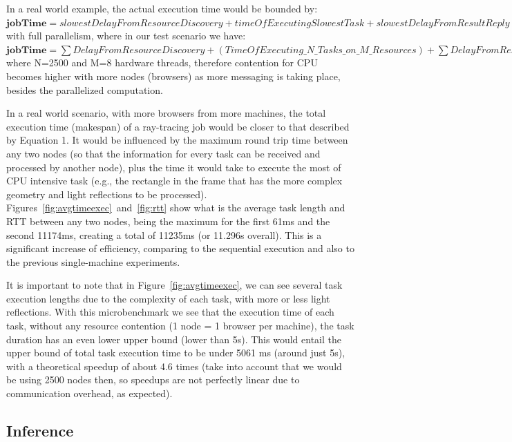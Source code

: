 In a real world example, the actual execution time would be bounded by:\\

$\textbf{jobTime}=slowestDelayFromResourceDiscovery+timeOfExecutingSlowestTask+slowestDelayFromResultReply (1)$ \\

with full parallelism, where in our test scenario we have: \\

$\textbf{jobTime}=\sum{DelayFromResourceDiscovery}+(TimeOfExecuting\_N\_Tasks\_on\_M\_Resources)+\sum{DelayFromResultReply} (2)$\\

where N=2500 and M=8 hardware threads, therefore contention for CPU becomes higher with more nodes (browsers) as more messaging is taking place, besides the parallelized computation.

In a real world scenario, with more browsers from more machines, the total execution time (makespan) of a ray-tracing job would be closer to that described by Equation 1. It would be influenced by the maximum round trip time between any two nodes (so that the information for every task can be received and processed by another node), plus the time it would take to execute the most of CPU intensive task (e.g., the rectangle in the frame that has the more complex geometry and light reflections to be processed). Figures~\ref{fig:avgtimeexec}~and~\ref{fig:rtt} show what is the average task length and RTT between any two nodes, being the maximum for the first 61ms and the second 11174ms, creating a total of 11235ms (or 11.296s overall). This is a significant increase of efficiency, comparing to the sequential execution and also to the previous single-machine experiments.

It is important to note that in Figure~\ref{fig:avgtimeexec}, we can see several task execution lengths due to the complexity of each task, with more or less light reflections. With this microbenchmark we see that the execution time of each task, without any resource contention (1 node = 1 browser per machine), the task duration has an even lower upper bound (lower than 5s). This would entail the upper bound of total task execution time to be under 5061 ms (around just 5s), with a theoretical speedup of about 4.6 times (take into account that we would be using 2500 nodes then, so speedups are not perfectly linear due to communication overhead, as expected).

\subsection{Inference}

